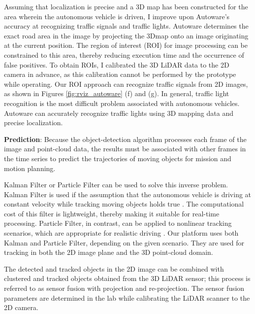 Assuming that localization is precise and a 3D map has been constructed for the area
wherein the autonomous vehicle is driven, I improve upon Autoware's accuracy at recognizing traffic signals and traffic lights.
Autoware determines the exact road area in the image by projecting the 3Dmap onto an image originating at the current position.
The region of interest (ROI) for image
processing can be constrained to this area, thereby reducing execution time and
the occurrence of false positives.
To obtain ROIs, I calibrated the 3D LiDAR data to the 2D camera in advance, as
this calibration cannot be performed by the prototype while operating.
Our ROI approach can recognize traffic signals from 2D images, as shown in Figures \ref{fig:rviz_autoware} (f) and (g).
In general, traffic light recognition is the most
difficult problem associated with autonomous vehicles.
Autoware can accurately recognize traffic lights using 3D mapping data and precise
localization.



\textbf{Prediction}:
Because the object-detection algorithm processes each frame of the image and point-cloud data, the results must be associated with other frames in the time series to predict the trajectories of moving objects for mission and motion planning.

Kalman Filter or Particle Filter can be used to solve this inverse problem.
Kalman Filter is used if the assumption that the autonomous vehicle is driving at constant velocity while tracking moving objects holds true \cite{kalman1960new}.
The computational cost of this filter is lightweight, thereby making it suitable for real-time processing.
Particle Filter, in contrast, can be applied to nonlinear tracking scenarios, which are appropriate for realistic driving \cite{arulampalam2002tutorial}.
Our platform uses both Kalman and Particle Filter, depending on the given scenario.
They are used for tracking in both the 2D image plane and the 3D point-cloud domain.

The detected and tracked objects in the 2D image can be combined with clustered and tracked objects obtained from the 3D LiDAR sensor;
this process is referred to as sensor fusion with projection and re-projection.
The sensor fusion parameters are determined in the lab while calibrating the LiDAR scanner to the 2D camera.

